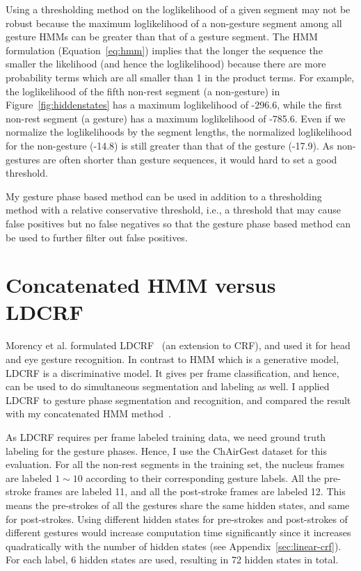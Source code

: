 Using a thresholding method on the loglikelihood of a
given segment may not be robust because the maximum loglikelihood of a non-gesture
segment among all gesture HMMs can be greater than that of a gesture segment.
The HMM formulation (Equation~\ref{eq:hmm}) implies that the longer the sequence the smaller the
likelihood (and hence the loglikelihood) because there are more probability
terms which are all smaller than 1 in the product terms. For example, the
loglikelihood of the fifth non-rest segment (a non-gesture) in
Figure~\ref{fig:hiddenstates} has a maximum loglikelihood of -296.6, while the
first non-rest segment (a gesture) has a maximum loglikelihood of -785.6. 
Even if we normalize the loglikelihoods by the segment lengths, the normalized
loglikelihood for the non-gesture (-14.8) is still greater than that of the
gesture (-17.9). As non-gestures are often shorter than gesture sequences, it
would hard to set a good threshold.
 
My gesture phase based method can be used in addition to a thresholding method
with a relative conservative threshold, i.e., a threshold that may cause false
positives but no false negatives so that the gesture phase based method can be used to further
filter out false positives.

\section{Concatenated HMM versus LDCRF}
Morency et al. formulated LDCRF~\cite{morency07} (an extension to CRF), and used
it for head and eye gesture recognition. In contrast to HMM which is a
generative model, LDCRF is a discriminative model. It gives
per frame classification, and hence, can 
be used to do simultaneous segmentation and labeling as well. I applied LDCRF to gesture phase segmentation and recognition, and
compared the result with my concatenated HMM method~\cite{yin13}. 

As LDCRF requires per frame labeled training data, we need ground truth labeling
for the gesture phases. Hence, I use the ChAirGest dataset for this
evaluation. For all the non-rest segments in the training set, the nucleus
frames are labeled $1\sim 10$ according to their corresponding gesture labels.
All the pre-stroke frames are labeled 11, and all the post-stroke
frames are labeled 12. This means the pre-strokes of all the gestures share the
same hidden states, and same for post-strokes. Using different hidden states
for pre-strokes and post-strokes of different gestures would increase
computation time significantly since it increases quadratically with the number
of hidden states (see Appendix~\ref{sec:linear-crf}). For each label, 6 hidden
states are used, resulting in 72 hidden states in total.

